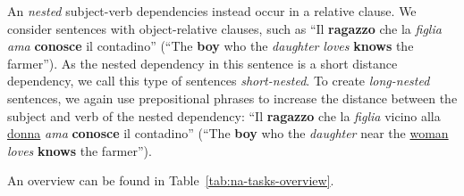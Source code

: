 An \emph{nested} subject-verb dependencies instead occur in a relative clause. 
We consider sentences with object-relative clauses, such as ``Il \textbf{ragazzo} che la \emph{figlia} \emph{ama} \textbf{conosce} il contadino'' (``The \textbf{boy} who the \emph{daughter} \emph{loves} \textbf{knows} the farmer'').
As the nested dependency in this sentence is a short distance dependency, we call this type of sentences \emph{short-nested}.
To create \emph{long-nested} sentences, we again use prepositional phrases to increase the distance between the subject and verb of the nested dependency: ``Il \textbf{ragazzo} che la \emph{figlia} vicino alla \underline{donna} \emph{ama} \textbf{conosce} il contadino'' (``The \textbf{boy} who the \emph{daughter} near the \underline{woman} \emph{loves} \textbf{knows} the farmer'').

An overview can be found in Table~\ref{tab:na-tasks-overview}.

